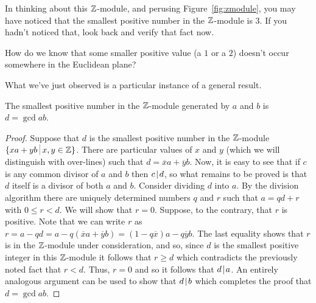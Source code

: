 In thinking about this ${\mathbb Z}$-module, and perusing 
Figure~\ref{fig:zmodule}, you may have noticed that the smallest 
positive number in the ${\mathbb Z}$-module is 3.  If you hadn't 
noticed that, look back and verify that fact now.  

\begin{exer}
How do we know that some smaller positive value (a $1$ or a $2$) doesn't
occur somewhere in the Euclidean plane?
\end{exer}

What we've just observed is a particular instance of a general result.

\begin{thm} \label{gcduniqueexists}
The smallest positive number in the ${\mathbb Z}$-module generated by
$a$ and $b$ is $d = \gcd{a}{b}$.
\end{thm}

\begin{proof}
Suppose that $d$ is the smallest positive number
in the ${\mathbb Z}$-module $\{ xa + yb \suchthat x,y \in \Integers \}$.  
There are particular values of $x$ and $y$ (which we will distinguish
with over-lines) such that $d = \overline{x}a + \overline{y}b$.  Now, it 
is easy to see that if $c$ is any common divisor of $a$ and $b$ then
$c \!\mid\! d$, so what remains to be proved is that $d$ itself is a divisor
of both $a$ and $b$.  Consider dividing $d$ into $a$.  By the 
division algorithm there are uniquely determined numbers $q$ and $r$
such that $a =qd + r$ with $0 \leq r < d$.  We will show that $r=0$.
Suppose, to the contrary, that $r$ is positive.  Note that we can
write $r$ as $r = a - qd = a - q(\overline{x}a + \overline{y}b) = (1-q\overline{x})a - q\overline{y}b$.  The last equality shows that $r$ is in the
${\mathbb Z}$-module under consideration, and so, since $d$ is the smallest
positive integer in this ${\mathbb Z}$-module it follows that $r \geq d$ which
contradicts the previously noted fact that $r < d$.  Thus, $r=0$ and so
it follows that $d \!\mid\! a$.  An entirely analogous argument can be used
to show that $d \!\mid\! b$ which completes the proof that $d = \gcd{a}{b}$. 
\end{proof} 
 

\clearpage







%
%

 
